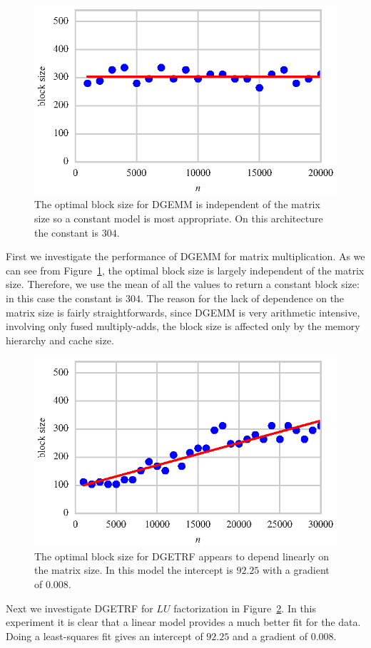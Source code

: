 \documentclass[a4paper,12pt]{article}
\begin{document}
\begin{figure}[ht]
  \centering
  \includegraphics[scale=1]{fig/curvefit_const.eps}
  \caption{The optimal block size for DGEMM is independent of the
    matrix size so a constant model is most appropriate.
    On this architecture the constant is $304$.}
  \label{fig.fit_const}
\end{figure}
First we investigate the performance of DGEMM
for matrix multiplication.
As we can see from Figure~\ref{fig.fit_const},
the optimal block size is largely independent of the matrix size.
Therefore, we use the mean of all the values to return a constant
block size:
in this case the constant is $304$.
The reason for the lack of dependence on the matrix size is
fairly straightforwards,
since DGEMM is very arithmetic intensive,
involving only fused multiply-adds,
the block size is affected only by the memory hierarchy
and cache size.

\begin{figure}[ht]
  \centering
  \includegraphics[scale=1]{fig/curvefit_linear.eps}
  \caption{The optimal block size for DGETRF appears to depend
    linearly on the matrix size. In this model the intercept is
    $92.25$ with a gradient of $0.008$.}
  \label{fig.fit_linear}
\end{figure}
Next we investigate DGETRF for $LU$ factorization
in Figure~\ref{fig.fit_linear}.
In this experiment it is clear that a linear model
provides a much better fit for the data.
Doing a least-squares fit gives an intercept of $92.25$
and a gradient of $0.008$.
\end{document}
